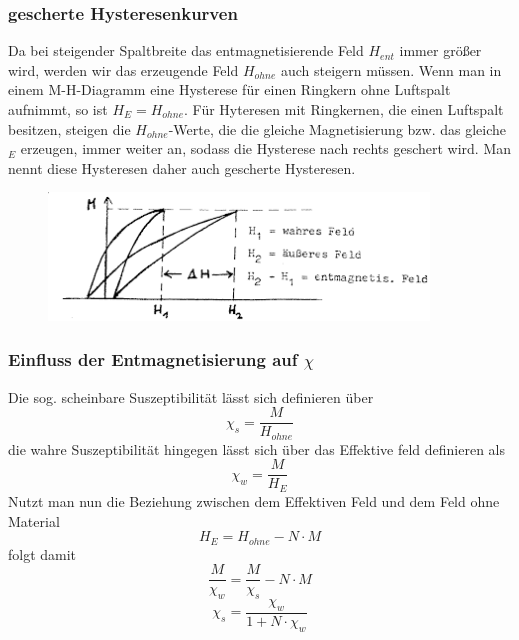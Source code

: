         \subsubsection*{gescherte Hysteresenkurven}
            Da bei steigender Spaltbreite das entmagnetisierende Feld $H_{ent}$ immer größer wird, werden wir das erzeugende Feld $H_{ohne}$
            auch steigern müssen. Wenn man in einem M-H-Diagramm eine Hysterese für einen Ringkern
            ohne Luftspalt aufnimmt, so ist $H_{E}=H_{ohne}$. Für Hyteresen mit Ringkernen,
            die einen Luftspalt besitzen, steigen die $H_{ohne}$-Werte, die die gleiche Magnetisierung
            bzw. das gleiche $_{E}$ erzeugen, immer weiter an, sodass die Hysterese nach rechts
            geschert wird. Man nennt diese Hysteresen daher auch gescherte Hysteresen.
            \begin{figure}
                \centering
                \includegraphics[width=0.9\textwidth]{Images/geschert.png}
            \end{figure}

        \subsubsection*{Einfluss der Entmagnetisierung auf $\chi$}
            Die sog. scheinbare Suszeptibilität lässt sich definieren über
            \begin{equation}
                \chi_s = \frac{M}{H_{ohne}}
            \end{equation}
            die wahre Suszeptibilität hingegen lässt sich über das Effektive feld definieren als
            \begin{equation}
                \chi_w = \frac{M}{H_{E}}
            \end{equation}
            Nutzt man nun die Beziehung zwischen dem Effektiven Feld und dem Feld ohne Material
            \begin{equation}
                H_E = H_{ohne} - N\cdot M
            \end{equation}
            folgt damit
            \begin{equation}
                \frac{M}{\chi_w} = \frac{M}{\chi_s} - N \cdot M
            \end{equation}
            \begin{equation}
                \chi_s = \frac{\chi_w}{1+N\cdot \chi_w}
            \end{equation}

